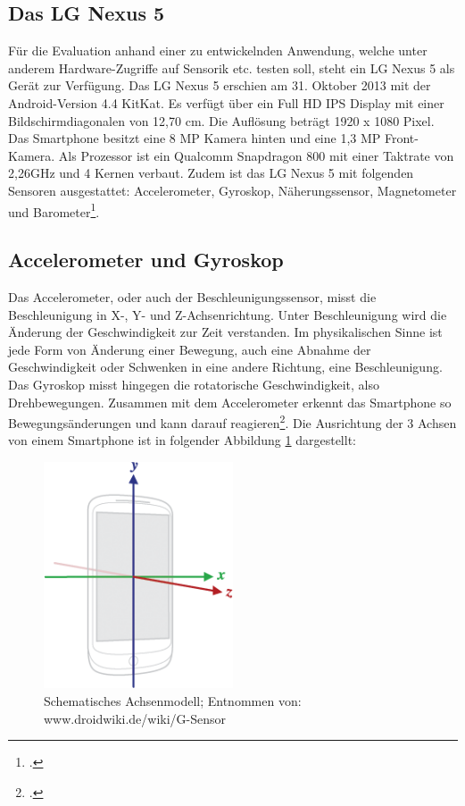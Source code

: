 \subsection{Das LG Nexus 5}

Für die Evaluation anhand einer zu entwickelnden Anwendung, welche unter anderem Hardware-Zugriffe auf Sensorik etc. testen soll, steht ein LG Nexus 5 als Gerät zur Verfügung. Das LG Nexus 5 erschien am 31. Oktober 2013 mit der Android-Version 4.4 KitKat. Es verfügt über ein Full HD IPS Display mit einer Bildschirmdiagonalen von 12,70 cm. Die Auflösung beträgt 1920 x 1080 Pixel. Das Smartphone besitzt eine 8 MP Kamera hinten und eine 1,3 MP Front-Kamera. Als Prozessor ist ein Qualcomm Snapdragon 800 mit einer Taktrate von 2,26GHz und 4 Kernen verbaut. Zudem ist das LG Nexus 5 mit folgenden Sensoren ausgestattet: Accelerometer, Gyroskop, Näherungssensor, Magnetometer und Barometer\footcite{Nexus5}. 

\subsection{Accelerometer und Gyroskop} \label{GrundlagenAccGyro}

Das Accelerometer, oder auch der Beschleunigungssensor, misst die Beschleunigung in X-, Y- und Z-Achsenrichtung. Unter Beschleunigung wird die Änderung der Geschwindigkeit zur Zeit verstanden. Im physikalischen Sinne ist jede Form von Änderung einer Bewegung, auch eine Abnahme der Geschwindigkeit oder Schwenken in eine andere Richtung, eine Beschleunigung. Das Gyroskop misst hingegen die rotatorische Geschwindigkeit, also Drehbewegungen. Zusammen mit dem Accelerometer erkennt das Smartphone so Bewegungsänderungen und kann darauf reagieren\footcite{AndroidWiki}. Die Ausrichtung der 3 Achsen von einem Smartphone ist in folgender Abbildung \ref{fig:Achsenausrichtung} dargestellt:

\begin{figure}[h]
	\centering
	\includegraphics[width=0.5\textwidth]{Bilder/Axis_device.PNG}
	\caption{Schematisches Achsenmodell; Entnommen von: www.droidwiki.de/wiki/G-Sensor}
	\label{fig:Achsenausrichtung}
\end{figure}

